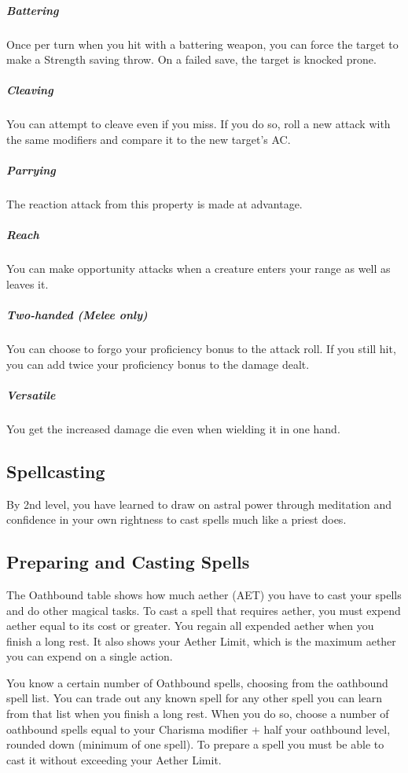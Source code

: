 \subparagraph*{Battering} Once per turn when you hit with a battering weapon, you can force the target to make a Strength saving throw. On a failed save, the target is knocked prone.

\subparagraph*{Cleaving} You can attempt to cleave even if you miss. If you do so, roll a new attack with the same modifiers and compare it to the new target's AC.

\subparagraph*{Parrying} The reaction attack from this property is made at advantage.

\subparagraph*{Reach} You can make opportunity attacks when a creature enters your range as well as leaves it.

\subparagraph*{Two-handed (Melee only)} You can choose to forgo your proficiency bonus to the attack roll. If you still hit, you can add twice your proficiency bonus to the damage dealt.

\subparagraph*{Versatile} You get the increased damage die even when wielding it in one hand.

\subsection{Spellcasting}

By 2nd level, you have learned to draw on astral power through meditation and confidence in your own rightness to cast spells much like a priest does.

\subsection{Preparing and Casting Spells}

The Oathbound table shows how much aether (AET) you have to cast your spells and do other magical tasks. To cast a spell that requires aether, you must expend aether equal to its cost or greater. You regain all expended aether when you finish a long rest. It also shows your Aether Limit, which is the maximum aether you can expend on a single action.

You know a certain number of Oathbound spells, choosing from the oathbound spell list. You can trade out any known spell for any other spell you can learn from that list when you finish a long rest. When you do so, choose a number of oathbound spells equal to your Charisma modifier + half your oathbound level, rounded down (minimum of one spell). To prepare a spell you must be able to cast it without exceeding your Aether Limit.


